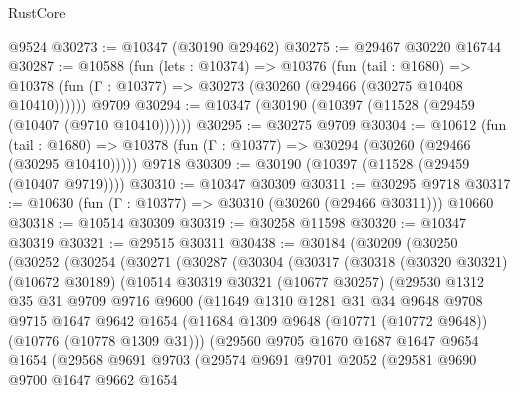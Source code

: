 \begin{lexlean}{RustCore}
\begin{coremodule}
    @9524
@30273 := @10347 (@30190 @29462)
@30275 := @29467 @30220 @16744
@30287 := @10588
    (fun (lets : @10374) =>
    @10376
      (fun (tail : @1680) =>
      @10378 (fun (Γ : @10377) => @30273 (@30260 (@29466 (@30275 @10408 @10410))))))
    @9709
@30294 := @10347 (@30190 (@10397 (@11528 (@29459 (@10407 (@9710 @10410))))))
@30295 := @30275 @9709
@30304 := @10612
    (fun (tail : @1680) => @10378 (fun (Γ : @10377) => @30294 (@30260 (@29466 (@30295 @10410)))))
    @9718
@30309 := @30190 (@10397 (@11528 (@29459 (@10407 @9719))))
@30310 := @10347 @30309
@30311 := @30295 @9718
@30317 := @10630 (fun (Γ : @10377) => @30310 (@30260 (@29466 @30311))) @10660
@30318 := @10514 @30309
@30319 := @30258 @11598
@30320 := @10347 @30319
@30321 := @29515 @30311
@30438 := @30184
    (@30209
      (@30250
        (@30252
          (@30254
            (@30271
              (@30287
                (@30304
                  (@30317
                    (@30318
                      (@30320 @30321)
                      (@10672 @30189)
                      (@10514
                        @30319
                        @30321
                        (@10677 @30257)
                        (@29530
                          @1312
                          @35
                          @31
                          @9709
                          @9716
                          @9600
                          (@11649
                            @1310
                            @1281
                            @31
                            @34
                            @9648
                            @9708
                            @9715
                            @1647
                            @9642
                            @1654
                            (@11684 @1309 @9648 (@10771 (@10772 @9648)) (@10776 (@10778 @1309 @31)))
                            (@29560
                              @9705
                              @1670
                              @1687
                              @1647
                              @9654
                              @1654
                              (@29568
                                @9691
                                @9703
                                (@29574
                                  @9691
                                  @9701
                                  @2052
                                  (@29581
                                    @9690
                                    @9700
                                    @1647
                                    @9662
                                    @1654

\end{coremodule}
\end{lexlean}
